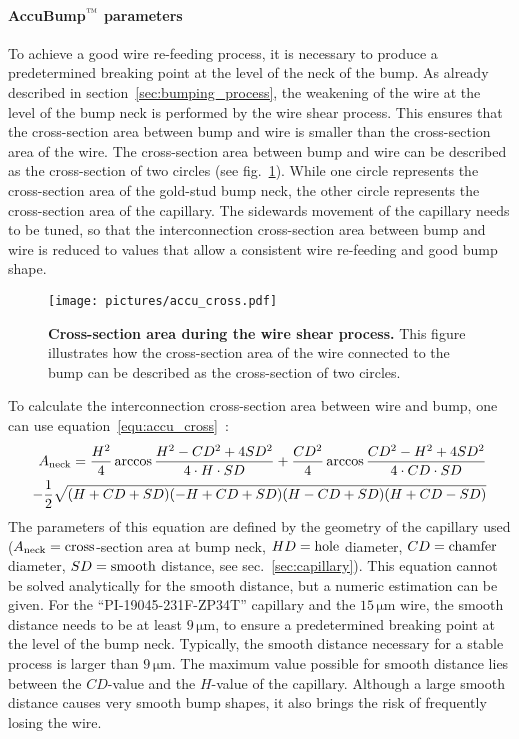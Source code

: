 \paragraph*{AccuBump$\rm{\symbTM}$ parameters}
To achieve a good wire re-feeding process, it is necessary to produce a predetermined breaking point at the level of the neck of the bump. As already described in section~\ref{sec:bumping_process}, the weakening of the wire at the level of the bump neck is performed by the wire shear process. This ensures that the cross-section area between bump and wire is smaller than the cross-section area of the wire. The cross-section area between bump and wire can be described as the cross-section of two circles (see fig.~\ref{fig:accu_cross}). While one circle represents the cross-section area of the gold-stud bump neck, the other circle represents the cross-section area of the capillary. The sidewards movement of the capillary needs to be tuned, so that the interconnection cross-section area between bump and wire is reduced to values that allow a consistent wire re-feeding and good bump shape.
\begin{figure}
\begin{center}
\texttt{[image: pictures/accu\_cross.pdf]}
\end{center}
\caption[Cross-section area during the wire shear process]{\textbf{Cross-section area during the wire shear process.} This figure illustrates how the cross-section area of the wire connected to the bump can be described as the cross-section of two circles.}\label{fig:accu_cross}
\end{figure}
To calculate the interconnection cross-section area between wire and bump, one can use equation~\ref{equ:accu_cross}~\cite{Wol14}:
\begin{equation}\label{equ:accu_cross}
\begin{split}
A_{\rm{neck}}=\frac{H^2}{4}\arccos{\frac{H^2-CD^2+4SD^2}{4\cdot H\cdot SD}}+\frac{CD^2}{4}\arccos{\frac{CD^2-H^2+4SD^2}{4\cdot CD\cdot SD}}\\-\frac{1}{2}\sqrt{(H+CD+SD)(-H+CD+SD)(H-CD+SD)(H+CD-SD)}\\
\end{split}
\end{equation}
The parameters of this equation are defined by the geometry of the capillary used ($A_{\rm{neck}}=\rm{cross}$-section area at bump neck, $HD=\rm{hole}$ diameter, $CD=\rm{chamfer}$ diameter, $SD=\rm{smooth}$ distance, see sec.~\ref{sec:capillary}). This equation cannot be solved analytically for the smooth distance, but a numeric estimation can be given. For the ``PI-19045-231F-ZP34T'' capillary and the $15\,\si{\micro \meter}$ wire, the smooth distance needs to be at least $9\,\si{\micro \meter}$, to ensure a predetermined breaking point at the level of the bump neck. Typically, the smooth distance necessary for a stable process is larger than $9\,\si{\micro \meter}$. The maximum value possible for smooth distance lies between the $CD$-value and the $H$-value of the capillary. Although a large smooth distance causes very smooth bump shapes, it also brings the risk of frequently losing the wire.


